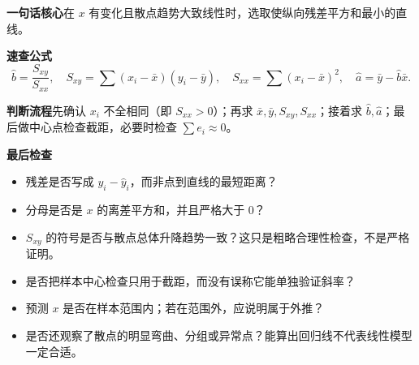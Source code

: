 \clearpage
\begin{summarybox}
\textbf{一句话核心}\quad 在 $x$ 有变化且散点趋势大致线性时，选取使纵向残差平方和最小的直线。

\textbf{速查公式}
\[
 \hat b=\frac{S_{xy}}{S_{xx}},\quad S_{xy}=\sum(x_i-\bar x)(y_i-\bar y),\quad
 S_{xx}=\sum(x_i-\bar x)^2,\quad \hat a=\bar y-\hat b\bar x.
\]

\textbf{判断流程}\quad 先确认 $x_i$ 不全相同（即 $S_{xx}>0$）；再求 $\bar x,\bar y,S_{xy},S_{xx}$；接着求 $\hat b,\hat a$；最后做中心点检查截距，必要时检查 $\sum e_i\approx0$。

\textbf{最后检查}
\begin{itemize}[leftmargin=*,itemsep=0.35em,topsep=0.25em]
\item 残差是否写成 $y_i-\hat y_i$，而非点到直线的最短距离？
\item 分母是否是 $x$ 的离差平方和，并且严格大于 $0$？
\item $S_{xy}$ 的符号是否与散点总体升降趋势一致？这只是粗略合理性检查，不是严格证明。
\item 是否把样本中心检查只用于截距，而没有误称它能单独验证斜率？
\item 预测 $x$ 是否在样本范围内；若在范围外，应说明属于外推？
\item 是否还观察了散点的明显弯曲、分组或异常点？能算出回归线不代表线性模型一定合适。
\end{itemize}
\end{summarybox}
